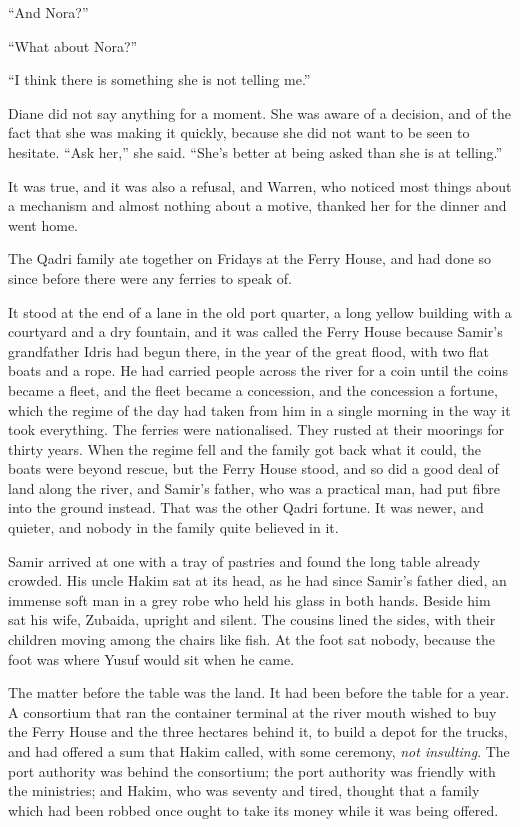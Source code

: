 ``And Nora?''

``What about Nora?''

``I think there is something she is not telling me.''

Diane did not say anything for a moment. She was aware of a decision, and of the fact that she was making it quickly, because she did not want to be seen to hesitate. ``Ask her,'' she said. ``She's better at being asked than she is at telling.''

It was true, and it was also a refusal, and Warren, who noticed most things about a mechanism and almost nothing about a motive, thanked her for the dinner and went home.

\scenebreak
\noindent The Qadri family ate together on Fridays at the Ferry House, and had done so since before there were any ferries to speak of.

It stood at the end of a lane in the old port quarter, a long yellow building with a courtyard and a dry fountain, and it was called the Ferry House because Samir's grandfather Idris had begun there, in the year of the great flood, with two flat boats and a rope. He had carried people across the river for a coin until the coins became a fleet, and the fleet became a concession, and the concession a fortune, which the regime of the day had taken from him in a single morning in the way it took everything. The ferries were nationalised. They rusted at their moorings for thirty years. When the regime fell and the family got back what it could, the boats were beyond rescue, but the Ferry House stood, and so did a good deal of land along the river, and Samir's father, who was a practical man, had put fibre into the ground instead. That was the other Qadri fortune. It was newer, and quieter, and nobody in the family quite believed in it.

Samir arrived at one with a tray of pastries and found the long table already crowded. His uncle Hakim sat at its head, as he had since Samir's father died, an immense soft man in a grey robe who held his glass in both hands. Beside him sat his wife, Zubaida, upright and silent. The cousins lined the sides, with their children moving among the chairs like fish. At the foot sat nobody, because the foot was where Yusuf would sit when he came.

The matter before the table was the land. It had been before the table for a year. A consortium that ran the container terminal at the river mouth wished to buy the Ferry House and the three hectares behind it, to build a depot for the trucks, and had offered a sum that Hakim called, with some ceremony, \emph{not insulting}. The port authority was behind the consortium; the port authority was friendly with the ministries; and Hakim, who was seventy and tired, thought that a family which had been robbed once ought to take its money while it was being offered.

